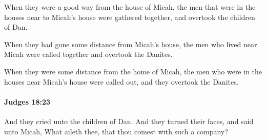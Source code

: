 			\begin{versebox}
					\item[BHS] 
					\item[ASV] When they were a good way from the house of Micah, the men that were in the houses near to Micah's house were gathered together, and overtook the children of Dan.
					\item[NIV] When they had gone some distance from Micah’s house, the men who lived near Micah were called together and overtook the Danites.
					\item[NRSV] When they were some distance from the home of Micah, the men who were in the houses near Micah’s house were called out, and they overtook the Danites.
			\end{versebox}

		\paragraph{Judges 18:23} %
			\label{JUDGES-18-23}

			And they cried unto the children of Dan. And they turned their faces, and said unto Micah, What aileth thee, that thou comest with such a company?

